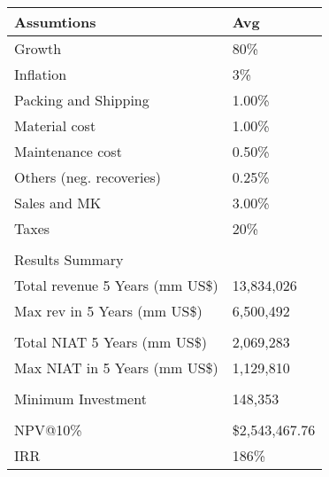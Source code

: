 \begin{tabular}{ll}
\hline
 Assumtions                     & Avg           \\
\hline
 Growth                         & 80\%           \\
 Inflation                      & 3\%            \\
 Packing and Shipping           & 1.00\%         \\
 Material cost                  & 1.00\%         \\
 Maintenance cost               & 0.50\%         \\
 Others (neg. recoveries)       & 0.25\%         \\
 Sales and MK                   & 3.00\%         \\
 Taxes                          & 20\%           \\
                                &               \\
\hline 
 Results Summary                &               \\
 Total revenue 5 Years (mm US\$) & 13,834,026    \\
 Max rev in 5 Years (mm US\$)    & 6,500,492     \\
                                &               \\
\hline 
 Total NIAT 5 Years (mm US\$)    & 2,069,283     \\
 Max NIAT in 5 Years (mm US\$)   & 1,129,810     \\
                                &               \\
\hline 
 Minimum Investment             & 148,353       \\
                                &               \\
\hline 
 NPV@10\%                        & \$2,543,467.76 \\
 IRR                            & 186\%          \\
\hline
\end{tabular}
